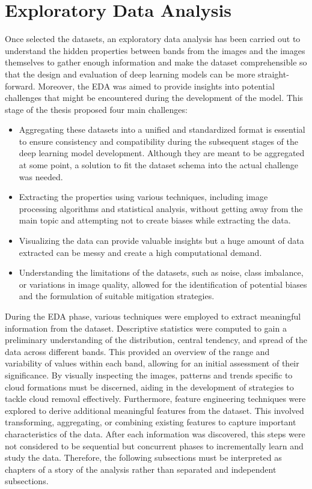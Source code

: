 \documentclass[11pt, a4paper]{article}
\begin{document}
	\section{Exploratory Data Analysis}
	Once selected the datasets, an exploratory data analysis has been carried out to understand the hidden properties between bands from the images and the images themselves to gather enough information and make the dataset comprehensible so that the design and evaluation of deep learning models can be more straight-forward. Moreover, the EDA was aimed to provide insights into potential challenges that might be encountered during the development of the model. This stage of the thesis proposed four main challenges:
	\begin{itemize}
		\item Aggregating these datasets into a unified and standardized format is essential to ensure consistency and compatibility during the subsequent stages of the deep learning model development. Although they are meant to be aggregated at some point, a solution to fit the dataset schema into the actual challenge was needed.
		\item Extracting the properties using various techniques, including image processing algorithms and statistical analysis, without getting away from the main topic and attempting not to create biases while extracting the data.
		\item Visualizing the data can provide valuable insights but a huge amount of data extracted can be messy and create a high computational demand. 
		\item Understanding the limitations of the datasets, such as noise, class imbalance, or variations in image quality, allowed for the identification of potential biases and the formulation of suitable mitigation strategies.
	\end{itemize}
	During the EDA phase, various techniques were employed to extract meaningful information from the dataset. Descriptive statistics were computed to gain a preliminary understanding of the distribution, central tendency, and spread of the data across different bands. This provided an overview of the range and variability of values within each band, allowing for an initial assessment of their significance.
	By visually inspecting the images, patterns and trends specific to cloud formations must be discerned, aiding in the development of strategies to tackle cloud removal effectively. Furthermore, feature engineering techniques were explored to derive additional meaningful features from the dataset. This involved transforming, aggregating, or combining existing features to capture important characteristics of the data. After each information was discovered, this steps were not considered to be sequential but concurrent phases to incrementally learn and study the data. Therefore, the following subsections must be interpreted as chapters of a story of the analysis rather than separated and independent subsections.
\end{document}

